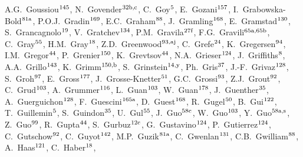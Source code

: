 \begin{flushleft}
A.G.~Goussiou$^\textrm{\scriptsize 145}$,    
N.~Govender$^\textrm{\scriptsize 32b,c}$,    
C.~Goy$^\textrm{\scriptsize 5}$,    
E.~Gozani$^\textrm{\scriptsize 157}$,    
I.~Grabowska-Bold$^\textrm{\scriptsize 81a}$,    
P.O.J.~Gradin$^\textrm{\scriptsize 169}$,    
E.C.~Graham$^\textrm{\scriptsize 88}$,    
J.~Gramling$^\textrm{\scriptsize 168}$,    
E.~Gramstad$^\textrm{\scriptsize 130}$,    
S.~Grancagnolo$^\textrm{\scriptsize 19}$,    
V.~Gratchev$^\textrm{\scriptsize 134}$,    
P.M.~Gravila$^\textrm{\scriptsize 27f}$,    
F.G.~Gravili$^\textrm{\scriptsize 65a,65b}$,    
C.~Gray$^\textrm{\scriptsize 55}$,    
H.M.~Gray$^\textrm{\scriptsize 18}$,    
Z.D.~Greenwood$^\textrm{\scriptsize 93,aj}$,    
C.~Grefe$^\textrm{\scriptsize 24}$,    
K.~Gregersen$^\textrm{\scriptsize 94}$,    
I.M.~Gregor$^\textrm{\scriptsize 44}$,    
P.~Grenier$^\textrm{\scriptsize 150}$,    
K.~Grevtsov$^\textrm{\scriptsize 44}$,    
N.A.~Grieser$^\textrm{\scriptsize 124}$,    
J.~Griffiths$^\textrm{\scriptsize 8}$,    
A.A.~Grillo$^\textrm{\scriptsize 143}$,    
K.~Grimm$^\textrm{\scriptsize 150,b}$,    
S.~Grinstein$^\textrm{\scriptsize 14,y}$,    
Ph.~Gris$^\textrm{\scriptsize 37}$,    
J.-F.~Grivaz$^\textrm{\scriptsize 128}$,    
S.~Groh$^\textrm{\scriptsize 97}$,    
E.~Gross$^\textrm{\scriptsize 177}$,    
J.~Grosse-Knetter$^\textrm{\scriptsize 51}$,    
G.C.~Grossi$^\textrm{\scriptsize 93}$,    
Z.J.~Grout$^\textrm{\scriptsize 92}$,    
C.~Grud$^\textrm{\scriptsize 103}$,    
A.~Grummer$^\textrm{\scriptsize 116}$,    
L.~Guan$^\textrm{\scriptsize 103}$,    
W.~Guan$^\textrm{\scriptsize 178}$,    
J.~Guenther$^\textrm{\scriptsize 35}$,    
A.~Guerguichon$^\textrm{\scriptsize 128}$,    
F.~Guescini$^\textrm{\scriptsize 165a}$,    
D.~Guest$^\textrm{\scriptsize 168}$,    
R.~Gugel$^\textrm{\scriptsize 50}$,    
B.~Gui$^\textrm{\scriptsize 122}$,    
T.~Guillemin$^\textrm{\scriptsize 5}$,    
S.~Guindon$^\textrm{\scriptsize 35}$,    
U.~Gul$^\textrm{\scriptsize 55}$,    
J.~Guo$^\textrm{\scriptsize 58c}$,    
W.~Guo$^\textrm{\scriptsize 103}$,    
Y.~Guo$^\textrm{\scriptsize 58a,s}$,    
Z.~Guo$^\textrm{\scriptsize 99}$,    
R.~Gupta$^\textrm{\scriptsize 44}$,    
S.~Gurbuz$^\textrm{\scriptsize 12c}$,    
G.~Gustavino$^\textrm{\scriptsize 124}$,    
P.~Gutierrez$^\textrm{\scriptsize 124}$,    
C.~Gutschow$^\textrm{\scriptsize 92}$,    
C.~Guyot$^\textrm{\scriptsize 142}$,    
M.P.~Guzik$^\textrm{\scriptsize 81a}$,    
C.~Gwenlan$^\textrm{\scriptsize 131}$,    
C.B.~Gwilliam$^\textrm{\scriptsize 88}$,    
A.~Haas$^\textrm{\scriptsize 121}$,    
C.~Haber$^\textrm{\scriptsize 18}$,    

\end{flushleft}

